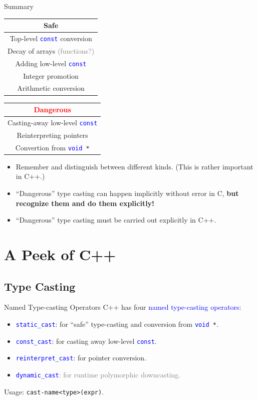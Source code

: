 \documentclass{beamer}
\newcommand{\red}[1]{\textcolor{red}{#1}}
\newcommand{\blue}[1]{\textcolor{blue}{#1}}
\newcommand{\gray}[1]{\textcolor{gray}{#1}}
\newcommand{\ttt}[1]{\texttt{#1}}
\newcommand{\bluett}[1]{\blue{\ttt{#1}}}
\theoremstyle{definition}
\begin{document}
\begin{frame}{Summary}
    \begin{center}
        \begin{tabular}{|c|}
            \hline
            Safe\\
            \hline
            Top-level \bluett{const} conversion\\
            Decay of arrays \gray{(functions?)}\\
            Adding low-level \bluett{const}\\
            Integer promotion\\
            Arithmetic conversion\\
            \hline
        \end{tabular}
        \begin{tabular}{|c|}
            \hline
            \red{Dangerous}\\
            \hline
            Casting-away low-level \bluett{const}\\
            Reinterpreting pointers\\
            Convertion from \bluett{void }\ttt{*}\\
            \hline
        \end{tabular}
    \end{center}
    \begin{itemize}
        \item Remember and distinguish between different kinds. (This is rather important in C++.)
        \item ``Dangerous'' type casting can happen implicitly without error in C, \textbf{but recognize them and do them explicitly!}
        \item ``Dangerous'' type casting must be carried out explicitly in C++.
    \end{itemize}
\end{frame}

\section{A Peek of C++}

\subsection{Type Casting}

\begin{frame}{Named Type-casting Operators}
    C++ has four \blue{named type-casting operators}:
    \begin{itemize}
        \item \bluett{static\_cast}: for ``safe'' type-casting and conversion from \bluett{void }\ttt{*}.
        \item \bluett{const\_cast}: for casting away low-level \bluett{const}.
        \item \bluett{reinterpret\_cast}: for pointer conversion.
        \item \gray{\bluett{dynamic\_cast}: for runtime polymorphic downcasting.}
    \end{itemize}
    \pause
    Usage: \ttt{cast-name<type>(expr)}.
\end{frame}
\end{document}
